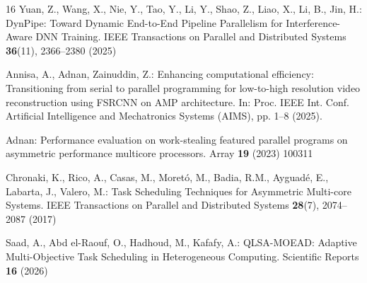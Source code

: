 \documentclass[runningheads]{llncs}
\begin{document}
\begin{thebibliography}{16}
Yuan, Z., Wang, X., Nie, Y., Tao, Y., Li, Y., Shao, Z., Liao, X., Li, B., Jin, H.: DynPipe: Toward Dynamic End-to-End Pipeline Parallelism for Interference-Aware DNN Training. IEEE Transactions on Parallel and Distributed Systems \textbf{36}(11), 2366--2380 (2025)

Annisa, A., Adnan, Zainuddin, Z.: Enhancing computational efficiency: Transitioning from serial to parallel programming for low-to-high resolution video reconstruction using FSRCNN on AMP architecture. In: Proc. IEEE Int. Conf. Artificial Intelligence and Mechatronics Systems (AIMS), pp. 1--8 (2025). 

Adnan: Performance evaluation on work-stealing featured parallel programs on asymmetric performance multicore processors. Array \textbf{19} (2023) 100311

Chronaki, K., Rico, A., Casas, M., Moretó, M., Badia, R.M., Ayguadé, E., Labarta, J., Valero, M.: Task Scheduling Techniques for Asymmetric Multi-core Systems. IEEE Transactions on Parallel and Distributed Systems \textbf{28}(7), 2074--2087 (2017)

Saad, A., Abd el-Raouf, O., Hadhoud, M., Kafafy, A.: QLSA-MOEAD: Adaptive Multi-Objective Task Scheduling in Heterogeneous Computing. Scientific Reports \textbf{16} (2026)
\end{thebibliography}
\end{document}

